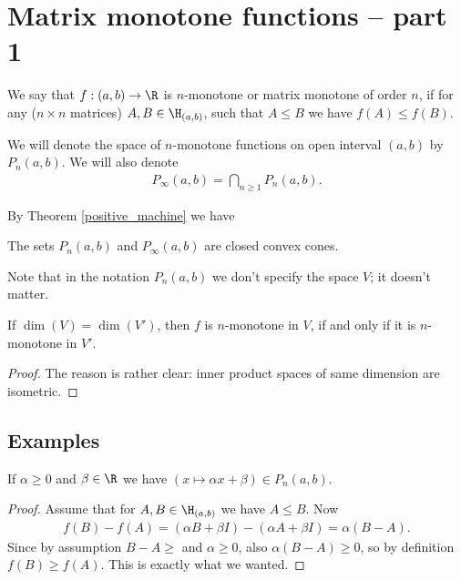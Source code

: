 \chapter{Matrix monotone functions -- part 1}

\begin{maar}\label{n_mon_maar}
	We say that $f : (a, b) \to \R$ is $n$-monotone or matrix monotone of order $n$, if for any ($n \times n$ matrices) $A, B \in \H_{(a, b)}$, such that $A \leq B$ we have $f(A) \leq f(B)$.
\end{maar}

We will denote the space of $n$-monotone functions on open interval $(a, b)$ by $P_{n}(a, b)$. We will also denote
\begin{align*}
	P_{\infty}(a, b) = \bigcap_{n \geq 1} P_{n}(a, b).
\end{align*}

By Theorem \ref{positive_machine} we have

\begin{prop}
	The sets $P_{n}(a, b)$ and $P_{\infty}(a, b)$ are closed convex cones.
\end{prop}

Note that in the notation $P_{n}(a, b)$ we don't specify the space $V$; it doesn't matter.

\begin{prop}
	If $\dim(V) = \dim(V')$, then $f$ is $n$-monotone in $V$, if and only if it is $n$-monotone in $V'$.
\end{prop}
\begin{proof}
	The reason is rather clear: inner product spaces of same dimension are isometric.
\end{proof}

\section{Examples}

\begin{prop}
	If $\alpha \geq 0$ and $\beta \in \R$ we have $(x \mapsto \alpha x + \beta) \in P_{n}(a, b)$.
\end{prop}
\begin{proof}
	Assume that for $A, B \in \H_{(a, b)}$ we have $A \leq B$. Now
	\begin{align*}
		f(B) - f(A) = (\alpha B + \beta I) - (\alpha A + \beta I) = \alpha (B - A).
	\end{align*}
	Since by assumption $B - A \geq $ and $\alpha \geq 0$, also $\alpha (B - A) \geq 0$, so by definition $f(B) \geq f(A)$. This is exactly what we wanted.
\end{proof}


